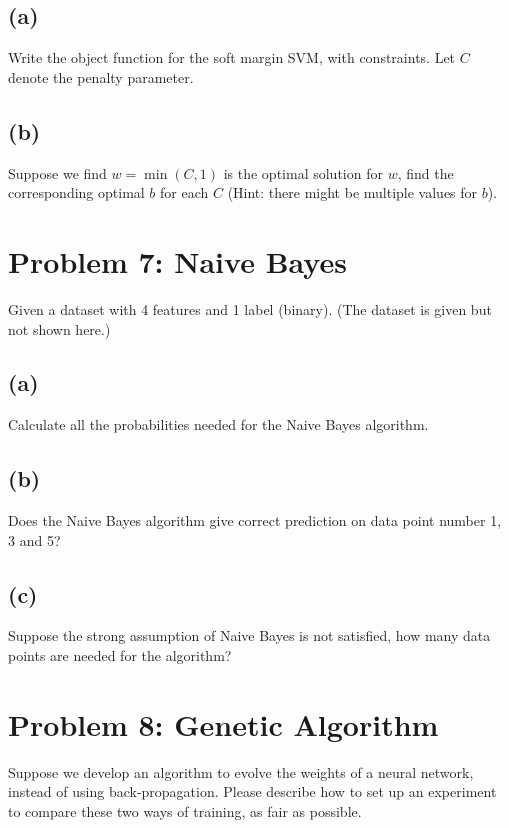 \documentclass[a4paper,12pt]{article}
\begin{document}
\subsection*{(a)}

Write the object function for the soft margin SVM, with constraints. Let $C$ denote the penalty parameter.

\subsection*{(b)}

Suppose we find $w = \min(C, 1)$ is the optimal solution for $w$, find the corresponding optimal $b$ for each $C$ (Hint: there might be multiple values for $b$).

\section*{Problem 7: Naive Bayes}

Given a dataset with 4 features and 1 label (binary). (The dataset is given but not shown here.)

\subsection*{(a)}

Calculate all the probabilities needed for the Naive Bayes algorithm.

\subsection*{(b)}

Does the Naive Bayes algorithm give correct prediction on data point number 1, 3 and 5?

\subsection*{(c)}

Suppose the strong assumption of Naive Bayes is not satisfied, how many data points are needed for the algorithm?

\section*{Problem 8: Genetic Algorithm}

Suppose we develop an algorithm to evolve the weights of a neural network, instead of using back-propagation. Please describe how to set up an experiment to compare these two ways of training, as fair as possible.
\end{document}
